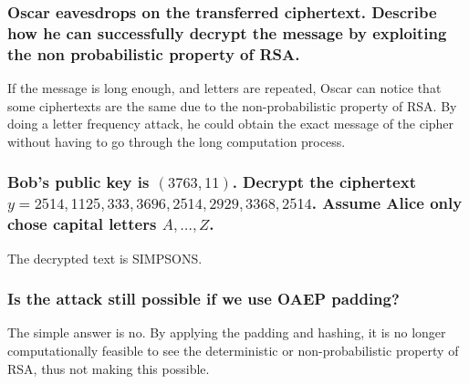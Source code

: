 \documentclass[titlepage]{article}
\begin{document}
{{\subsubsection{Oscar eavesdrops on the transferred ciphertext. Describe how he can successfully decrypt the message by exploiting the non probabilistic property of RSA.}
{
If the message is long enough, and letters are repeated, Oscar can notice that some ciphertexts are the same due to the non-probabilistic property of RSA. By doing a letter frequency attack, he could obtain the exact message of the cipher without having to go through the long computation process.
}
\subsubsection{Bob's public key is \((3763, 11)\). Decrypt the ciphertext \(y = 2514, 1125, 333, 3696, 2514, 2929, 3368, 2514\). Assume Alice only chose capital letters \(A, \dots, Z\).}
{
The decrypted text is SIMPSONS.
}
\subsubsection{Is the attack still possible if we use OAEP padding?}
{
The simple answer is no. By applying the padding and hashing, it is no longer computationally feasible to see the deterministic or non-probabilistic property of RSA, thus not making this possible.
}
}
}
\clearpage
\end{document}
